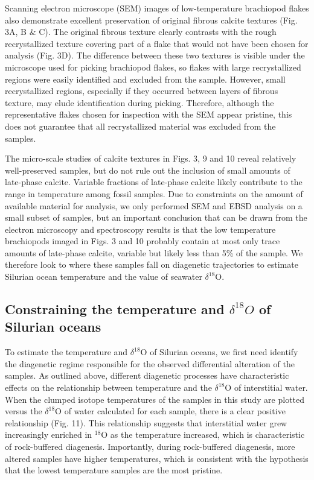 \documentclass[preprint, authoryear]{elsarticle}
\begin{document}
Scanning electron microscope (SEM) images of low-temperature brachiopod flakes also demonstrate excellent preservation of original fibrous calcite textures (Fig. 3A, B \& C). The original fibrous texture clearly contrasts with the rough recrystallized texture covering part of a flake that would not have been chosen for analysis (Fig. 3D). The difference between these two textures is visible under the microscope used for picking brachiopod flakes, so flakes with large recrystallized regions were easily identified and excluded from the sample. However, small recrystallized regions, especially if they occurred between layers of fibrous texture, may elude identification during picking. Therefore, although the representative flakes chosen for inspection with the SEM appear pristine, this does not guarantee that all recrystallized material was excluded from the samples.

The micro-scale studies of calcite textures in Figs. 3, 9 and 10 reveal relatively well-preserved samples, but do not rule out the inclusion of small amounts of late-phase calcite. Variable fractions of late-phase calcite likely contribute to the range in temperature among fossil samples. Due to constraints on the amount of available material for analysis, we only performed SEM and EBSD analysis on a small subset of samples, but an important conclusion that can be drawn from the electron microscopy and spectroscopy results is that the low temperature brachiopods imaged in Figs. 3 and 10 probably contain at most only trace amounts of late-phase calcite, variable but likely less than 5\% of the sample. We therefore look to where these samples fall on diagenetic trajectories to estimate Silurian ocean temperature and the value of seawater $\delta^{18}$O. 

\subsection{Constraining the temperature and $\mathit{\delta^{18}}\textit{O}$ of Silurian oceans} 

To estimate the temperature and $\delta^{18}$O of Silurian oceans, we first need identify the diagenetic regime responsible for the observed differential alteration of the samples. As outlined above, different diagenetic processes have characteristic effects on the relationship between temperature and the $\delta^{18}$O of interstitial water. When the clumped isotope temperatures of the samples in this study are plotted versus the $\delta^{18}$O of water calculated for each sample, there is a clear positive relationship (Fig. 11). This relationship suggests that interstitial water grew increasingly enriched in $^{18}$O as the temperature increased, which is characteristic of rock-buffered diagenesis. Importantly, during rock-buffered diagenesis, more altered samples have higher temperatures, which is consistent with the hypothesis that the lowest temperature samples are the most pristine.
\end{document}
